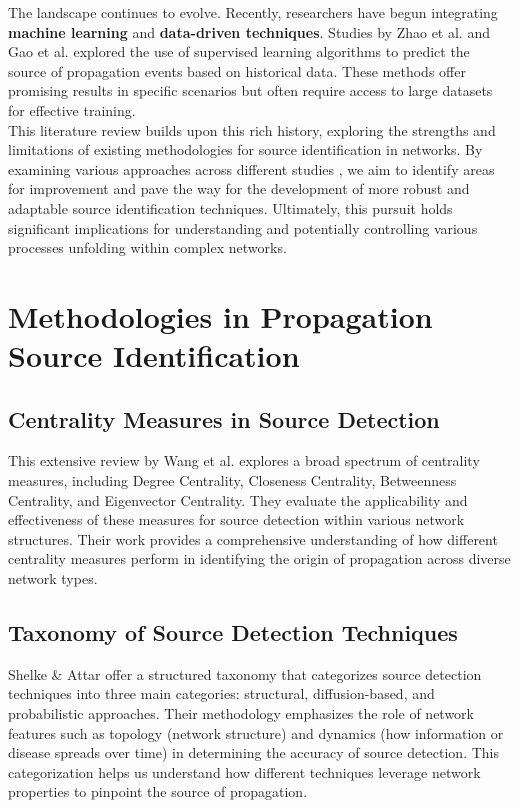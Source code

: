 The landscape continues to evolve. Recently, researchers have begun integrating \textbf{machine learning} and \textbf{data-driven techniques}. Studies by Zhao et al. \cite{zhao2016} and Gao et al. \cite{gao2018} explored the use of supervised learning algorithms to predict the source of propagation events based on historical data. These methods offer promising results in specific scenarios but often require access to large datasets for effective training.\\

This literature review builds upon this rich history, exploring the strengths and limitations of existing methodologies for source identification in networks. By examining various approaches across different studies \cite{wang2020, shelke2019, doe2018, liu2020}, we aim to identify areas for improvement and pave the way for the development of more robust and adaptable source identification techniques. Ultimately, this pursuit holds significant implications for understanding and potentially controlling various processes unfolding within complex networks.

\section{Methodologies in Propagation Source Identification}
\subsection{Centrality Measures in Source Detection}
This extensive review by Wang et al. \cite{wang2020} explores a broad spectrum of centrality measures, including Degree Centrality, Closeness Centrality, Betweenness Centrality, and Eigenvector Centrality. They evaluate the applicability and effectiveness of these measures for source detection within various network structures. Their work provides a comprehensive understanding of how different centrality measures perform in identifying the origin of propagation across diverse network types.

\subsection{Taxonomy of Source Detection Techniques}
Shelke \& Attar \cite{shelke2019} offer a structured taxonomy that categorizes source detection techniques into three main categories: structural, diffusion-based, and probabilistic approaches. Their methodology emphasizes the role of network features such as topology (network structure) and dynamics (how information or disease spreads over time) in determining the accuracy of source detection. This categorization helps us understand how different techniques leverage network properties to pinpoint the source of propagation.

